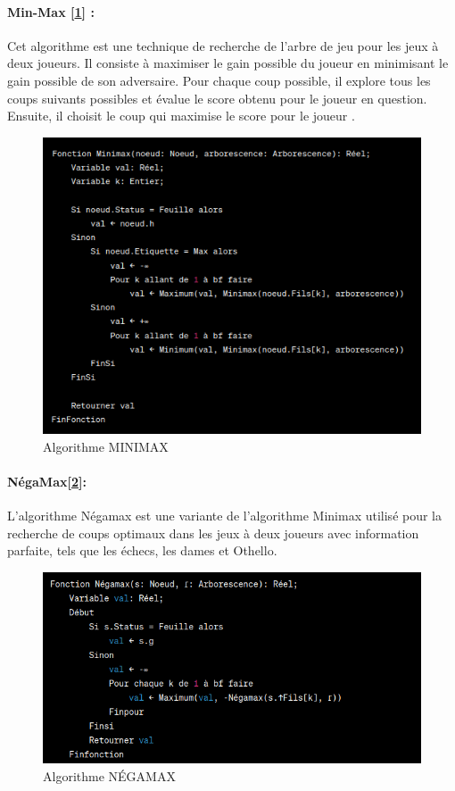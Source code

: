 \documentclass[12pt]{article}
\begin{document}
	    \paragraph{Min-Max [\ref{Algorithme MINIMAX}] :} Cet algorithme est une technique de recherche de l'arbre de jeu pour les jeux à deux joueurs. Il consiste à maximiser le gain possible du joueur en minimisant le gain possible de son adversaire. Pour chaque coup possible, il explore tous les coups suivants possibles et évalue le score obtenu pour le joueur en question. Ensuite, il choisit le coup qui maximise le score pour le joueur .
	    
	    
	    
	    \begin{figure}[H]
	    	\centering
	    	\includegraphics[scale=0.55]{img/minimax}
	    	\caption{Algorithme MINIMAX }
	    	\label{Algorithme MINIMAX}
	    \end{figure}
	\paragraph{NégaMax[\ref{Algorithme NégaMINIMAX}]:}L'algorithme Négamax est une variante de l'algorithme Minimax utilisé pour la recherche de coups optimaux dans les jeux à deux joueurs avec information parfaite, tels que les échecs, les dames et Othello.
	
	 \begin{figure}[H]
		\centering
		\includegraphics[scale=0.55]{img/negamax.png}
		\caption{Algorithme NÉGAMAX }
		\label{Algorithme NégaMINIMAX}
	\end{figure}
	
\end{document}

